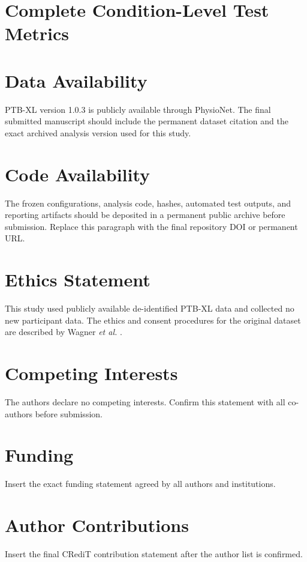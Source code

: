 \documentclass[journal]{IEEEtran}
\begin{document}
\section{Complete Condition-Level Test Metrics}

\section*{Data Availability}
PTB-XL version 1.0.3 is publicly available through PhysioNet. The final submitted manuscript should include the permanent dataset citation and the exact archived analysis version used for this study.

\section*{Code Availability}
The frozen configurations, analysis code, hashes, automated test outputs, and reporting artifacts should be deposited in a permanent public archive before submission. Replace this paragraph with the final repository DOI or permanent URL.

\section*{Ethics Statement}
This study used publicly available de-identified PTB-XL data and collected no new participant data. The ethics and consent procedures for the original dataset are described by Wagner \emph{et al.} \cite{wagner2020ptbxl}.

\section*{Competing Interests}
The authors declare no competing interests. Confirm this statement with all co-authors before submission.

\section*{Funding}
Insert the exact funding statement agreed by all authors and institutions.

\section*{Author Contributions}
Insert the final CRediT contribution statement after the author list is confirmed.
\end{document}
